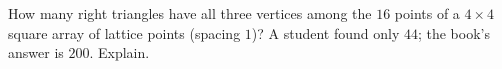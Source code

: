 How many right triangles have all three vertices among the $16$ points of a $4\times4$ square array of lattice points (spacing $1$)? A student found only $44$; the book's answer is $200$. Explain.
